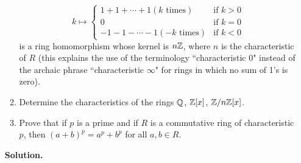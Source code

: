 \begin{enumerate}
\begin{enumerate}
                           \begin{equation*}
                              k \mapsto \left\{
                                 \begin{array}{ll}
                                    1 + 1 + \cdots + 1 (k \text{ times}) &
                                       \text{if } k > 0 \\
                                    0 & \text{if } k = 0 \\
                                    -1 - 1 - \cdots - 1 (-k \text{ times}) &
                                       \text{if } k < 0
                                 \end{array} \right.
                           \end{equation*}
                           is a ring homomorphism whose kernel is $n\mathbb{Z}$, where
                           $n$ is the characteristic of $R$ (this explains the
                           use of the terminology ``characteristic 0" instead of
                           the archaic phrase ``characteristic $\infty$" for
                           rings in which no sum of 1's is zero).
                     \item Determine the characteristics of the rings $\mathbb{Q}$,
                           $\mathbb{Z}[x]$, $\mathbb{Z}/n\mathbb{Z}[x]$.
                     \item Prove that if $p$ is a prime and if $R$ is a
                           commutative ring of characteristic $p$, then
                           $(a + b)^p = a^p + b^p$ for all $a, b \in R$.
                  \end{enumerate}

      \textbf{Solution.}


\end{enumerate}
